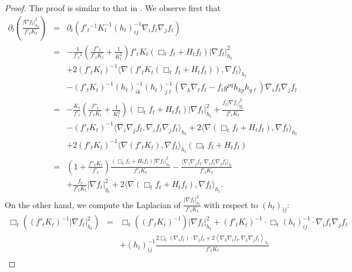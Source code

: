 \documentclass{amsart}
\theoremstyle{definition}
\theoremstyle{remark}
\numberwithin{equation}{section}
\begin{document}
\begin{proof} The proof is similar to that in \cite{C2}. We observe first that
\begin{eqnarray*}
\partial_{t}\left(\frac{|\nabla f_{t}|^{2}_{h_{t}}}{f'_{t}K_{t}}\right)&=&\partial_{t}
\left(f'_{t}{}^{-1}K^{-1}_{t}(h_{t})^{-1}_{ij}\nabla_{i}f_{t}\nabla_{j}f_{t}\right)\\
&=&-\frac{1}{f'_{t}{}^{2}}\left(\frac{f''_{t}}{f'_{t}K_{t}}+\frac{1}{K^{2}_{t}}
\right)f'_{t}K_{t}(\Box_{t} f_{t}+H_{t}f_{t})|\nabla f_{t}|^{2}_{h_{t}}
\\
&&+2(f'_{t}K_{t})^{-1}\langle\nabla(f'_{t}K_{t}(\Box_{t} f_{t}+H_{t}f_{t})),\nabla f_{t}\rangle_{h_{t}}\\
&&-(f'_{t}K_{t})^{-1}(h_{t})^{-1}_{ik}(h_{t})^{-1}_{j\ell}
\left(\nabla_{k}\nabla_{\ell}f_{t}-f_{t}g^{pq}h_{kp}h_{q\ell}\right)\nabla_{i}f_{t}
\nabla_{j}f_{t}\\
&=&-\frac{K_{t}}{f'_{t}}\left(\frac{f''_{t}}{f'_{t}K_{t}}+\frac{1}{K^{2}_{t}}
\right)
\left(\Box_{t} f_{t}+H_{t}f_{t}\right)|\nabla f_{t}|^{2}_{h_{t}}+\frac{f_{t}
|\nabla f_{t}|^{2}_{g_{t}}}{f'_{t}K_{t}}\\
&&-(f'_{t}K_{t})^{-1}\langle\nabla_{i}\nabla_{j}f_{t},\nabla_{i}f_{t}
\nabla_{j}f_{t}\rangle_{h_{t}}+2\langle\nabla(\Box_{t} f_{t}+H_{t}f_{t}),
\nabla f_{t}\rangle_{h_{t}}\\
&&+2(f'_{t}K_{t})^{-1}\langle\nabla(f'_{t}K_{t}),\nabla f_{t}
\rangle_{h_{t}}(\Box_{t} f_{t}+H_{t}f_{t})\\
&=&\left(1+\frac{f''_{t}K_{t}}{f'_{t}}\right)\frac{(\Box_{t} f_{t}
+H_{t}f_{t})|\nabla f_{t}|^{2}_{h_{t}}}{f'_{t}K_{t}}
-\frac{\langle\nabla_{i}\nabla_{j}f_{t},\nabla_{i}f_{t}
\nabla_{j}f_{t}\rangle_{h}}{f'_{t}K_{t}}\\
&&+\frac{f_{t}}{f'_{t}K_{t}}|\nabla f_{t}|^{2}_{g_{t}}
+2\langle\nabla(\Box_{t} f_{t}+H_{t}f_{t}),\nabla f_{t}\rangle_{h_{t}}.
\end{eqnarray*}
On the other hand, we compute the Laplacian of $\frac{|\nabla f_{t}
|^{2}_{h_{t}}}{f'_{t}K_{t}}$ with respect to $(h_{t})_{ij}$:
\begin{eqnarray*}
\Box_{t}\left((f'_{t}K_{t})^{-1}|\nabla f_{t}|^{2}_{h_{t}}\right)&=&\Box_{t}\left((f'_{t}K_{t})^{-1}\right)|\nabla f_{t}|^{2}_{h_{t}}
+(f'_{t}K_{t})^{-1}\cdot\Box_{t} (h_{t})^{-1}_{ij}
\cdot\nabla_{i}f_{t}\nabla_{j}f_{t}\\
&&+(h_{t})^{-1}_{ij}\frac{2\Box_{t}(\nabla_{i}f_{t})
\cdot\nabla_{j}f_{t}
+2\left\langle\nabla_{k}\nabla_{i}f_{t},\nabla_{k}\nabla_{j}f_{t}
\right\rangle_{h_{t}}}{f'_{t}K_{t}}\\

\end{eqnarray*}
\end{proof}
\end{document}
